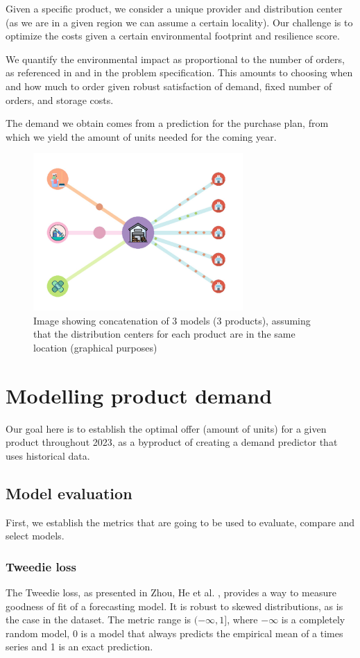 \documentclass[11pt,twocolumn]{article}
\begin{document}
Given a specific product, we consider a unique provider and distribution center (as we are in a given region we can assume a certain locality). Our challenge is to optimize the costs given a certain environmental footprint and resilience score.

We quantify the environmental impact as proportional to the number of orders, as referenced in \cite{key1} and in the problem specification. This amounts to choosing when and how much to order given robust satisfaction of demand, fixed number of orders, and storage costs.

The demand we obtain comes from a prediction for the purchase plan, from which we yield the amount of units needed for the coming year.

\begin{figure}[h]
	\centering
	\includegraphics[width=8cm]{WhatsApp Image 2023-11-12 at 01.28.21.jpeg}
	\caption{Image showing concatenation of 3 models (3 products), assuming that the distribution centers for each product are in the same location (graphical purposes)}
	\label{fig:enter-label}
\end{figure}

\section{Modelling product demand}
Our goal here is to establish the optimal offer (amount of units) for a given product throughout 2023, as a byproduct of creating a demand predictor that uses historical data.

\subsection{Model evaluation}
First, we establish the metrics that are going to be used to evaluate, compare and select models.

\subsubsection{Tweedie loss}
The Tweedie loss, as presented in Zhou, He et al. \cite{key5}, provides a way to measure goodness of fit of a forecasting model. It is robust to skewed distributions, as is the case in the dataset. The metric range is $(-\infty, 1]$, where $-\infty$ is a completely random model, 0 is a model that always predicts the empirical mean of a times series and 1 is an exact prediction.
\end{document}
